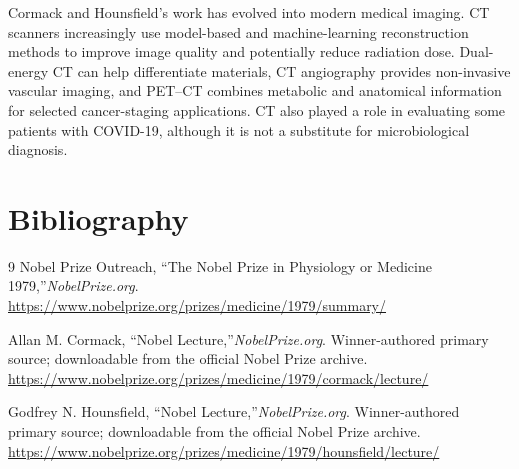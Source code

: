 Cormack and Hounsfield's work has evolved into modern medical imaging. CT scanners increasingly use model-based and machine-learning reconstruction methods to improve image quality and potentially reduce radiation dose. Dual-energy CT can help differentiate materials, CT angiography provides non-invasive vascular imaging, and PET--CT combines metabolic and anatomical information for selected cancer-staging applications. CT also played a role in evaluating some patients with COVID-19, although it is not a substitute for microbiological diagnosis.


\section{Bibliography}

\begin{thebibliography}{9}
Nobel Prize Outreach, ``The Nobel Prize in Physiology or Medicine 1979,''\emph{NobelPrize.org}.\\
\url{https://www.nobelprize.org/prizes/medicine/1979/summary/}

Allan M. Cormack, ``Nobel Lecture,''\emph{NobelPrize.org}. Winner-authored primary source; downloadable from the official Nobel Prize archive.\\
\url{https://www.nobelprize.org/prizes/medicine/1979/cormack/lecture/}

Godfrey N. Hounsfield, ``Nobel Lecture,''\emph{NobelPrize.org}. Winner-authored primary source; downloadable from the official Nobel Prize archive.\\
\url{https://www.nobelprize.org/prizes/medicine/1979/hounsfield/lecture/}
\end{thebibliography}
